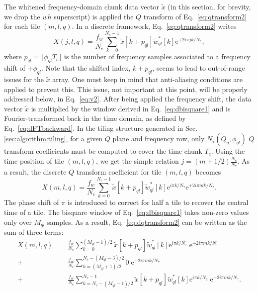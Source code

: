The whitened frequency-domain chunk data vector $\tilde{x}$ (in this section, for brevity, we drop the $wh$ superscript) is applied the $Q$ transform of Eq.~\ref{eq:qtransform2} for each tile $(m, l, q)$. In a discrete framework, Eq.~\ref{eq:qtransform2} writes
\begin{equation}
  X(j,l,q)=\frac{f_w}{N_c}\sum_{k=0}^{N_c-1}{\tilde{x}[k+p_{ql}]\tilde{w}_{ql}^*[k]\mathrm{e}^{+2i\pi jk/N_c}},
  \label{eq:dqtransform1}
\end{equation}
where $p_{ql}=\lfloor \phi_{ql}T_c \rfloor$ is the number of frequency samples associated to a frequency shift of $+\phi_{ql}$. Note that the shifted index, $k+p_{ql}$, seems to lead to out-of-range issues for the $\tilde{x}$ array. One must keep in mind that anti-aliasing conditions are applied to prevent this. This issue, not important at this point, will be properly addressed below, in Eq.~\ref{eq:v2}. After being applied the frequency shift, the data vector $\tilde{x}$ is multiplied by the window derived in Eq.~\ref{eq:dbisquare1} and is Fourier-transformed back in the time domain, as defined by Eq.~\ref{eq:dFTbackward}. In the tiling structure generated in Sec.\ref{sec:algorithm:tiling}, for a given $Q$ plane and frequency row, only $N_\tau(Q_q, \phi_{ql})$ $Q$ transform coefficients must be computed to cover the time chunk $T_c$. Using the time position of tile $(m,l,q)$, we get the simple relation $j=(m+1/2)\frac{N_c}{N_\tau}$. As a result, the discrete $Q$ transform coefficient for tile $(m,l,q)$ becomes
\begin{equation}
  X(m, l, q) = \frac{f_w}{N_c}\sum_{k=0}^{N_c-1}{\tilde{x}[k+p_{ql}]\tilde{w}_{ql}^*[k]\mathrm{e}^{i\pi k/N_\tau}\mathrm{e}^{+2i\pi mk/N_\tau}}.
  \label{eq:dqtransform2}
\end{equation}
The phase shift of $\pi$ is introduced to correct for half a tile to recover the central time of a tile. The bisquare window of Eq.~\ref{eq:dbisquare1} takes non-zero values only over $M_{ql}$ samples. As a result, Eq.~\ref{eq:dqtransform2} can be written as the sum of three terms:
\begin{align}
  X(m, l, q)
  = & \frac{f_w}{N_c} \sum_{k=0}^{(M_{ql}-1)/2}{\tilde{x}[k+p_{ql}]\tilde{w}_{ql}^*[k]\mathrm{e}^{i\pi k/N_\tau} \; \mathrm{e}^{+2i\pi mk/N_\tau}} \\
  + & \frac{f_w}{N_c} \sum_{k=(M_{ql}+1)/2}^{N_c-(M_{ql}-3)/2}{0 \; \mathrm{e}^{+2i\pi mk/N_\tau}} \\
  + & \frac{f_w}{N_c} \sum_{k=N_c-(M_{ql}-1)/2}^{N_c-1}{\tilde{x}[k+p_{ql}]\tilde{w}_{ql}^*[k]\mathrm{e}^{i\pi k/N_\tau} \; \mathrm{e}^{+2i\pi mk/N_\tau}} .
  \label{eq:dqtransform3}
\end{align}
